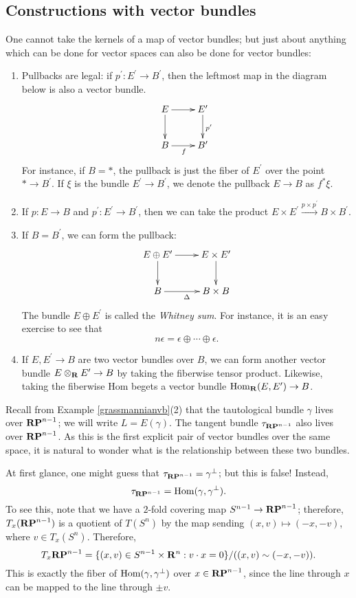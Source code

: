 \subsection{Constructions with vector bundles}
One cannot take the kernels of a map of vector bundles; but just about
anything which can be done for vector spaces can also be done for vector
bundles:
\begin{enumerate}
    \item Pullbacks are legal: if $p^\prime:E^\prime\to B^\prime$, then the
	leftmost map in the diagram below is also a vector bundle.
	\begin{equation*}
	    \xymatrix{
		E\ar[r]\ar[d] & E^\prime\ar[d]^{p^\prime}\\
		B\ar[r]_f & B^\prime
		}
	\end{equation*}
	For instance, if $B=\ast$, the pullback is just the fiber of $E^\prime$
	over the point $\ast\to B^\prime$. If $\xi$ is the bundle $E^\prime\to
	B^\prime$, we denote the pullback $E\to B$ as $f^\ast \xi$.
    \item If $p:E\to B$ and $p^\prime:E^\prime\to B^\prime$, then we can take
	the product $E\times E^\prime\xrightarrow{p\times p^\prime}B\times
	B^\prime$.
    \item If $B=B^\prime$, we can form the pullback:
	\begin{equation*}
	    \xymatrix{
		E\oplus E^\prime\ar[r]\ar[d] & E\times E^\prime\ar[d]\\
		B\ar[r]_{\Delta} & B\times B
		}
	\end{equation*}
	The bundle $E\oplus E^\prime$ is called the \emph{Whitney sum}. For
	instance, it is an easy exercise to see that
	$$n\epsilon = \epsilon\oplus\cdots\oplus\epsilon.$$
    \item If $E,E^\prime\to B$ are two vector bundles over $B$, we can form
	another vector bundle $E\otimes_\mathbf R E^\prime\to B$ by taking the
	fiberwise tensor product. Likewise, taking the fiberwise Hom begets a
	vector bundle $\operatorname{Hom}_\mathbf R(E,E^\prime)\to B$.
\end{enumerate}
\begin{example}
    Recall from Example \ref{grassmannianvb}(2) that the tautological bundle
    $\gamma$ lives over $\mathbf{RP}^{n-1}$; we will write $L = E(\gamma)$. The tangent
    bundle $\tau_{\mathbf{RP}^{n-1}}$ also lives over $\mathbf{RP}^{n-1}$. As this is the first
    explicit pair of vector bundles over the same space, it is natural to
    wonder what is the relationship between these two bundles.
    
    At first glance, one might guess that $\tau_{\mathbf{RP}^{n-1}} = \gamma^\perp$;
    but this is false! Instead,
    $$\tau_{\mathbf{RP}^{n-1}} = \operatorname{Hom}(\gamma,\gamma^\perp).$$
    To see this, note that we have a $2$-fold covering map $S^{n-1}\to
    \mathbf{RP}^{n-1}$; therefore, $T_x(\mathbf{RP}^{n-1})$ is a quotient of $T(S^n)$ by the
    map sending $(x,v)\mapsto (-x,-v)$, where $v\in T_x(S^n)$. Therefore,
    $$T_x\mathbf{RP}^{n-1} = \{(x,v)\in S^{n-1}\times\mathbf R^n:v\cdot x =
    0\}/((x,v)\sim(-x,-v)).$$
    This is exactly the fiber of $\operatorname{Hom}(\gamma,\gamma^\perp)$ over $x\in
    \mathbf{RP}^{n-1}$, since the line through $x$ can be mapped to the line through
    $\pm v$.
\end{example}
